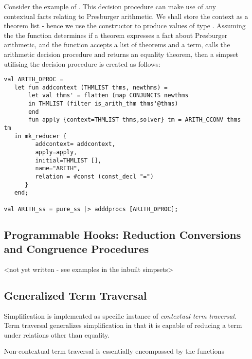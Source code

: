 Consider the example of .  This decision procedure can
make use of any contextual facts relating to Presburger arithmetic.
We shall store the context as a theorem list - hence we use the
constructor  to produce values of type .
Assuming the the function  determines if a
theorem expresses a fact about Presburger arithmetic, and the
function  accepts a list of theorems and a term,
calls the arithmetic decision procedure
and returns an equality theorem, then a simpset utilising the
decision procedure is created as follows:
\begin{session} \begin{verbatim}
val ARITH_DPROC = 
   let fun addcontext (THMLIST thms, newthms) = 
       let val thms' = flatten (map CONJUNCTS newthms
       in THMLIST (filter is_arith_thm thms'@thms)
       end
       fun apply {context=THMLIST thms,solver} tm = ARITH_CCONV thms tm
   in mk_reducer {
         addcontext= addcontext,
         apply=apply,
         initial=THMLIST [],
         name="ARITH",
         relation = #const (const_decl "=")
      }
   end;

val ARITH_ss = pure_ss |> adddprocs [ARITH_DPROC];
\end{verbatim} \end{session}


\subsection{Programmable Hooks: Reduction Conversions and
Congruence Procedures}

<not yet written - see examples in the inbuilt simpsets>

\subsection{Generalized Term Traversal}

Simplification is implemented as specific instance of {\em 
contextual term traversal}.  Term traversal generalizes
simplification in that it is capable of reducing a term
under relations other than equality.  

Non-contextual term traversal
is essentially encompassed by the functions

